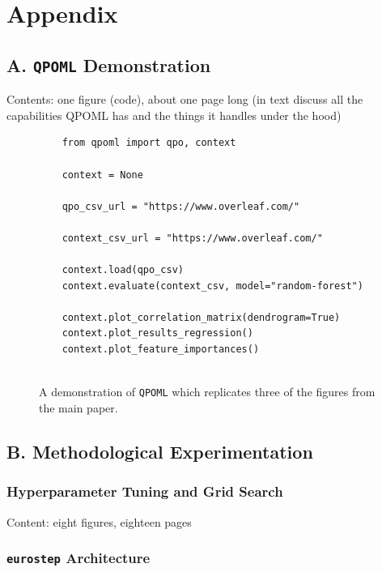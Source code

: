 \documentclass[fleqn,usenatbib]{mnras}
\begin{document}
%



\section*{Appendix}

\subsection*{A. \texttt{QPOML} Demonstration}\label{appendix:demo}

Contents: one figure (code), about one page long (in text discuss all the capabilities QPOML has and the things it handles under the hood)

\begin{figure}[H]
    \centering
    \begin{verbatim}
    from qpoml import qpo, context 
    
    context = None
    
    qpo_csv_url = "https://www.overleaf.com/"
    
    context_csv_url = "https://www.overleaf.com/"
    
    context.load(qpo_csv)
    context.evaluate(context_csv, model="random-forest")
    
    context.plot_correlation_matrix(dendrogram=True)
    context.plot_results_regression()
    context.plot_feature_importances()
    
    \end{verbatim}
    \caption{A demonstration of \texttt{QPOML} which replicates three of the figures from the main paper.}
    \label{fig:qpoml_demo}
\end{figure}

\subsection*{B. Methodological Experimentation}

\subsubsection{Hyperparameter Tuning and Grid Search}

Content: eight figures, eighteen pages 

\subsubsection{\texttt{eurostep} Architecture}
\end{document}
